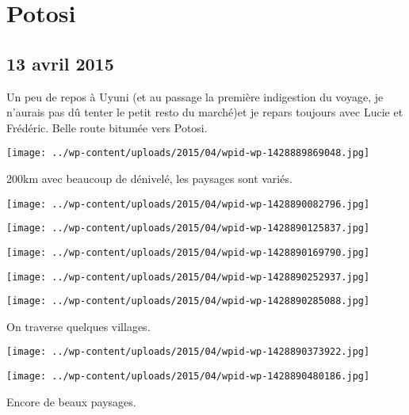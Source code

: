 \chapter{Potosi}
\section*{13 avril 2015}
Un peu de repos à Uyuni (et au passage la première indigestion du voyage, je n'aurais pas dû tenter le petit resto du marché)et je repars toujours avec Lucie et Frédéric. \newline
 Belle route bitumée vers Potosi.  \newline
 \newline
\centerline{\texttt{[image: ../wp-content/uploads/2015/04/wpid-wp-1428889869048.jpg]} } 
 \newline
 200km avec beaucoup de dénivelé, les paysages sont variés.  \newline
 \newline
\centerline{\texttt{[image: ../wp-content/uploads/2015/04/wpid-wp-1428890082796.jpg]} } 
 \newline
 \newline
\centerline{\texttt{[image: ../wp-content/uploads/2015/04/wpid-wp-1428890125837.jpg]} } 
 \newline
 \newline
\centerline{\texttt{[image: ../wp-content/uploads/2015/04/wpid-wp-1428890169790.jpg]} } 
 \newline
 \newline
\centerline{\texttt{[image: ../wp-content/uploads/2015/04/wpid-wp-1428890252937.jpg]} } 
 \newline
 \newline
\centerline{\texttt{[image: ../wp-content/uploads/2015/04/wpid-wp-1428890285088.jpg]} } 
 \newline
 On traverse quelques villages. \newline
 \newline
\centerline{\texttt{[image: ../wp-content/uploads/2015/04/wpid-wp-1428890373922.jpg]} } 
 \newline
 \newline
\centerline{\texttt{[image: ../wp-content/uploads/2015/04/wpid-wp-1428890480186.jpg]} } 
 \newline
 Encore de beaux paysages.  \newline
 \newline
